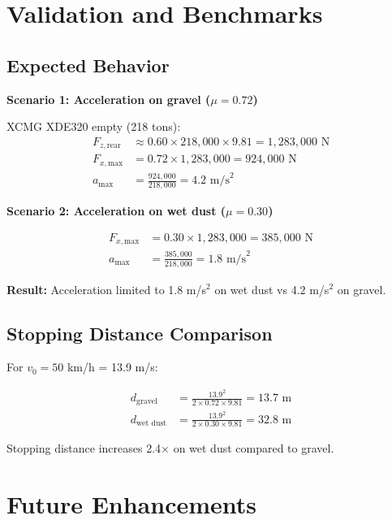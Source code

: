 \documentclass[11pt,a4paper]{article}
\begin{document}
\section{Validation and Benchmarks}

\subsection{Expected Behavior}

\textbf{Scenario 1: Acceleration on gravel ($\mu = 0.72$)}

XCMG XDE320 empty (218 tons):
\begin{align}
F_{z,\text{rear}} &\approx 0.60 \times 218{,}000 \times 9.81 = 1{,}283{,}000 \text{ N} \\
F_{x,\text{max}} &= 0.72 \times 1{,}283{,}000 = 924{,}000 \text{ N} \\
a_{\max} &= \frac{924{,}000}{218{,}000} = 4.2 \text{ m/s}^2
\end{align}

\textbf{Scenario 2: Acceleration on wet dust ($\mu = 0.30$)}

\begin{align}
F_{x,\text{max}} &= 0.30 \times 1{,}283{,}000 = 385{,}000 \text{ N} \\
a_{\max} &= \frac{385{,}000}{218{,}000} = 1.8 \text{ m/s}^2
\end{align}

\textbf{Result:} Acceleration limited to 1.8 m/s$^2$ on wet dust vs 4.2 m/s$^2$ on gravel.

\subsection{Stopping Distance Comparison}

For $v_0 = 50$ km/h = 13.9 m/s:

\begin{align}
d_{\text{gravel}} &= \frac{13.9^2}{2 \times 0.72 \times 9.81} = 13.7 \text{ m} \\
d_{\text{wet dust}} &= \frac{13.9^2}{2 \times 0.30 \times 9.81} = 32.8 \text{ m}
\end{align}

Stopping distance increases 2.4$\times$ on wet dust compared to gravel.

\section{Future Enhancements}
\end{document}
